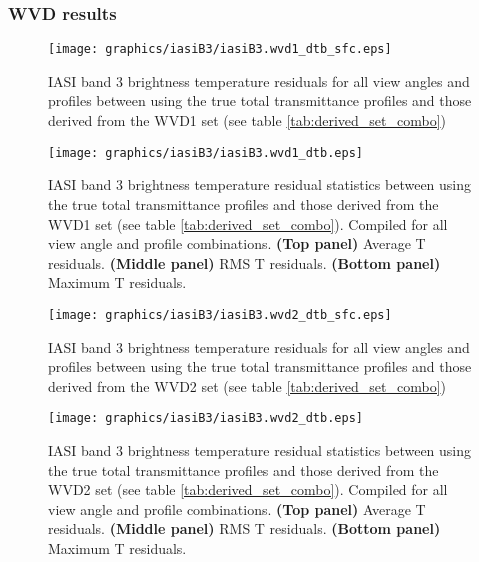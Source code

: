 \subsubsection{WVD results}
\begin{figure}[htp]
  \centering
  \texttt{[image: graphics/iasiB3/iasiB3.wvd1\_dtb\_sfc.eps]}
  \caption{IASI band 3 brightness temperature residuals for all view angles and profiles between using the true total transmittance profiles and those derived from the WVD1 set (see table \ref{tab:derived_set_combo})}
  \label{fig:iasiB3.wvd1_dtb_sfc}
  \vspace{1em}
  \texttt{[image: graphics/iasiB3/iasiB3.wvd1\_dtb.eps]}
  \caption{IASI band 3 brightness temperature residual statistics between using the true total transmittance profiles and those derived from the WVD1 set (see table \ref{tab:derived_set_combo}). Compiled for all view angle and profile combinations. \textbf{(Top panel)} Average T residuals. \textbf{(Middle panel)} RMS T residuals. \textbf{(Bottom panel)} Maximum T residuals.}
  \label{fig:iasiB3.wvd1_dtb}
\end{figure}

\begin{figure}[htp]
  \centering
  \texttt{[image: graphics/iasiB3/iasiB3.wvd2\_dtb\_sfc.eps]}
  \caption{IASI band 3 brightness temperature residuals for all view angles and profiles between using the true total transmittance profiles and those derived from the WVD2 set (see table \ref{tab:derived_set_combo})}
  \label{fig:iasiB3.wvd2_dtb_sfc}
  \vspace{1em}
  \texttt{[image: graphics/iasiB3/iasiB3.wvd2\_dtb.eps]}
  \caption{IASI band 3 brightness temperature residual statistics between using the true total transmittance profiles and those derived from the WVD2 set (see table \ref{tab:derived_set_combo}). Compiled for all view angle and profile combinations. \textbf{(Top panel)} Average T residuals. \textbf{(Middle panel)} RMS T residuals. \textbf{(Bottom panel)} Maximum T residuals.}
  \label{fig:iasiB3.wvd2_dtb}
\end{figure}
